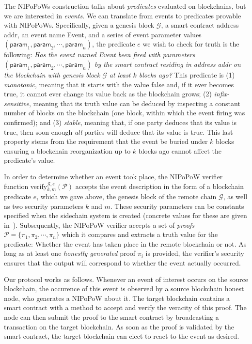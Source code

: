 The NIPoPoWs construction talks about \emph{predicates} evaluated on
blockchains, but we are interested in \emph{events}. We can translate from
events to predicates provable with NIPoPoWs. Specifically, given a genesis block
$\mathcal{G}$, a smart contract address \textsf{addr}, an event name
\textsf{Event}, and a series of event parameter values $(\textsf{param}_1,
\textsf{param}_2, \cdots, \textsf{param}_n)$, the predicate $e$ we wish to check
for truth is the following: \emph{Has the event named \textsf{Event} been fired
with parameters $(\textsf{param}_1, \textsf{param}_2, \cdots, \textsf{param}_n)$
by the smart contract residing in address \textsf{addr} on the blockchain with
genesis block $\mathcal{G}$ at least $k$ blocks ago?} This predicate
is (1) \emph{monotonic}, meaning that it starts with the value \textsf{false}
and, if it ever becomes \textsf{true}, it cannot ever change its value back as
the blockchain grows; (2) \emph{infix-sensitive}, meaning that its truth value
can be deduced by inspecting a constant number of blocks on the blockchain (one
block, within which the event firing was confirmed); and (3) \emph{stable},
meaning that, if one party deduces that its value is \textsf{true}, then soon
enough \emph{all} parties will deduce that its value is \textsf{true}. This last
property stems from the requirement that the event be buried under $k$ blocks
ensuring a blockchain reorganization up to $k$ blocks ago cannot affect the
predicate's value.

In order to determine whether an event took place, the NIPoPoW verifier function
\textsf{verify}$^{\mathcal{G},e}_{k,m}(\mathcal{P})$ accepts the event
description in the form of a blockchain predicate $e$, which we gave above, the
genesis block of the remote chain $\mathcal{G}$, as well as two security
parameters $k$ and $m$. These security parameters can be constants specified
when the sidechain system is created (concrete values for these are given
in~\cite{nipopows}). Subsequently, the NIPoPoW verifier accepts a set of
\emph{proofs} $\mathcal{P} = \{\pi_1, \pi_2, \cdots, \pi_n\}$ which it compares
and extracts a truth value for the predicate: Whether the event has taken place
in the remote blockchain or not. As long as at least one \emph{honestly
generated} proof $\pi_i$ is provided, the verifier's security ensures that the
output will correspond to whether the event actually occurred.

Our protocol works as follows. Whenever an event of interest occurs on the
source blockchain, the occurence of this event is observed by a source
blockchain honest node, who generates a NIPoPoW about it. The target blockchain
contains a smart contract with a method to accept and verify the veracity of
this proof. The node can then submit the proof to the smart contract by
broadcasting a transaction on the target blockchain. As soon as the proof is
validated by the smart contract, the target blockchain can elect to react to the
event as desired.

